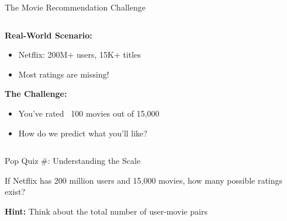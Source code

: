 \documentclass{beamer}
\begin{document}
\begin{frame}{The Movie Recommendation Challenge}
\begin{columns}[T]
\begin{column}{0.5\textwidth}
\textbf{Real-World Scenario:}
\begin{itemize}[<+->]
    \item Netflix: 200M+ users, 15K+ titles
    \item Most ratings are missing!
\end{itemize}

\pause
\vspace{0.3cm}
\textbf{The Challenge:}
\begin{itemize}[<+->]
    \item You've rated ~100 movies out of 15,000
    \item How do we predict what you'll like?
\end{itemize}
\end{column}
\begin{column}{0.5\textwidth}
\end{column}
\end{columns}
\end{frame}

\begin{frame}{Pop Quiz \#\thepopquiz: Understanding the Scale}
\begin{popquizbox}{\thepopquiz}
If Netflix has 200 million users and 15,000 movies, how many possible ratings exist?

\textbf{Hint:} Think about the total number of user-movie pairs
\end{popquizbox}
\end{frame}
\end{document}
